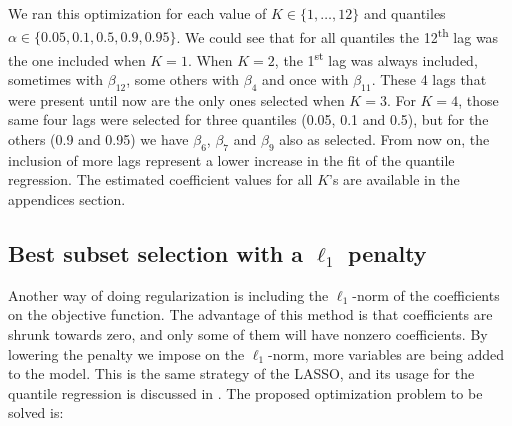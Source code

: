 We ran this optimization for each value of $K \in \{1, \dots, 12\}$ and quantiles $\alpha \in \{0.05, 0.1, 0.5, 0.9, 0.95\}$. We could see that for all quantiles the 12\textsuperscript{th} lag was the one included when $K=1$. When $K=2$, the 1\textsuperscript{st} lag was always included, sometimes with $\beta_{12}$, some others with $\beta_4$ and once with $\beta_{11}$. These 4 lags that were present until now are the only ones selected when $K=3$. For $K=4$, those same four lags were selected for three quantiles (0.05, 0.1 and 0.5), but for the others (0.9 and 0.95) we have $\beta_6$, $\beta_7$ and $\beta_9$ also as selected. From now on, the inclusion of more lags represent a lower increase in the fit of the quantile regression. The estimated coefficient values for all $K$'s are available in the appendices section. 



\subsection{Best subset selection with a $\ell_1$ penalty}
\label{sec:best-subset-ell1}

Another way of doing regularization is including the $\ell_1$-norm of the coefficients on the objective function. The advantage of this method is that coefficients are shrunk towards zero, and only some of them will have nonzero coefficients. By lowering the penalty we impose on the $\ell_1$-norm, more variables are being added to the model. 
This is the same strategy of the LASSO, and its usage for the quantile regression is discussed in \cite{li2012l1}.
The proposed optimization problem to be solved is:

